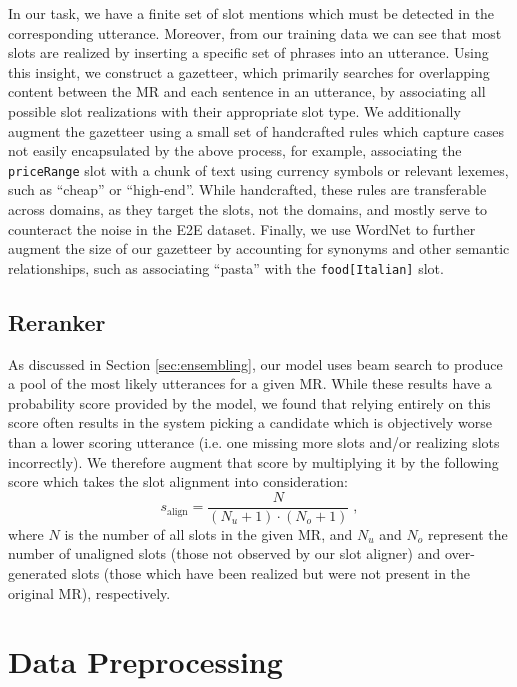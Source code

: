 \documentclass[11pt,a4paper]{article}
\begin{document}
In our task, we have a finite set of slot mentions which must be detected in the corresponding utterance. Moreover, from our training data we can see that most slots are realized by inserting a specific set of phrases into an utterance. Using this insight, we construct a gazetteer, which primarily searches for overlapping content between the MR and each sentence in an utterance, by associating all possible slot realizations with their appropriate slot type. We additionally augment the gazetteer using a small set of handcrafted rules which capture cases not easily encapsulated by the above process, for example, associating the \texttt{priceRange} slot with a chunk of text using currency symbols or relevant lexemes, such as ``cheap'' or ``high-end''. While handcrafted, these rules are transferable across domains, as they target the slots, not the domains, and mostly serve to counteract the noise in the E2E dataset. Finally, we use WordNet \cite{fellbaum1998wordnet} to further augment the size of our gazetteer by accounting for synonyms and other semantic relationships, such as associating ``pasta'' with the \texttt{food[Italian]} slot.


\subsection{Reranker}
\label{subsec:reranker}

As discussed in Section \ref{sec:ensembling}, our model uses beam search to produce a pool of the most likely utterances for a given MR. While these results have a probability score provided by the model, we found that relying entirely on this score often results in the system picking a candidate which is objectively worse than a lower scoring utterance (i.e. one missing more slots and/or realizing slots incorrectly). We therefore augment that score by multiplying it by the following score which takes the slot alignment into consideration:
\[ s_\text{align} = \frac{N}{(N_u + 1) \cdot (N_o + 1)} \;, \]
where $N$ is the number of all slots in the given MR, and $N_u$ and $N_o$ represent the number of unaligned slots (those not observed by our slot aligner) and over-generated slots (those which have been realized but were not present in the original MR), respectively.



\section{Data Preprocessing}
\label{sec:data}
\end{document}
